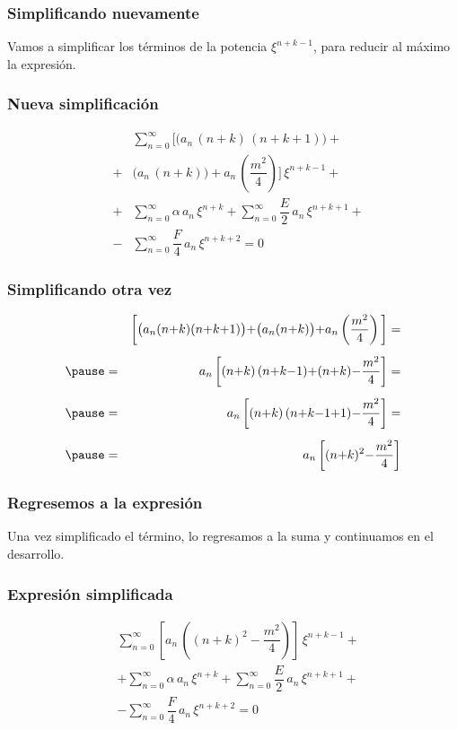 \begin{frame}
\frametitle{Simplificando nuevamente}
Vamos a simplificar los términos de la potencia $\xi^{n+k-1}$, para reducir al máximo la expresión.
\end{frame}
\begin{frame}
\frametitle{Nueva simplificación}
\vspace{-1cm}
\begin{eqnarray*}
&{}& \sum_{n=0}^{\infty} \bigg[ \big( a_{n} \, (n {+} k) \, (n {+} k {+} 1) \big) + \\[0.5em]
&+& \big( a_{n} \, (n {+} k) \big) {+} a_{n} \, \left( \dfrac{m^{2}}{4} \right) \bigg] \, \xi^{n+k-1} + \\[0.5em] 
&+& \sum_{n=0}^{\infty} \alpha \, a_{n} \, \xi^{n+k} + \sum_{n=0}^{\infty} \dfrac{E}{2} \, a_{n} \, \xi^{n+k+1} + \\[0.5em] 
&-& \sum_{n=0}^{\infty} \dfrac{F}{4} \, a_{n} \, \xi^{n+k+2} = 0
\end{eqnarray*}
\end{frame}
\begin{frame}
\frametitle{Simplificando otra vez}
\vspace{-1cm}
\begin{eqnarray*}
&{}& \bigg[ \big( a_{n} (n {+} k) (n {+} k {+} 1) \big) {+} \big( a_{n} (n {+} k) \big) {+} a_{n} \left( \dfrac{m^{2}}{4} \right) \bigg] = \\[0.5em] \pause
&=& a_{n} \, \bigg[  (n {+} k) \, (n {+} k {-} 1) {+} (n {+} k) {-} \dfrac{m^{2}}{4} \bigg] = \\[0.5em] \pause
&=& a_{n} \, \bigg[  (n {+} k) \, (n {+} k {-} 1 {+} {1}) {-} \dfrac{m^{2}}{4} \bigg] = \\[0.5em] \pause
&=& a_{n} \, \bigg[  (n {+} k)^{2} {-} \dfrac{m^{2}}{4} \bigg]
\end{eqnarray*}
\end{frame}
\begin{frame}
\frametitle{Regresemos a la expresión}
Una vez simplificado el término, lo regresamos a la suma y continuamos en el desarrollo.
\end{frame}
\begin{frame}
\frametitle{Expresión simplificada}
\vspace{-1cm}
\begin{align*}
&{} \sum_{n=0}^{\infty} \left[ a_{n} \, \left( (n {+} k)^{2} {-} \dfrac{m^{2}}{4} \right) \right] \, \xi^{n+k-1} + \\[0.5em] 
&+ \sum_{n=0}^{\infty} \alpha \, a_{n} \, \xi^{n+k} + \sum_{n=0}^{\infty} \dfrac{E}{2} \, a_{n} \, \xi^{n+k+1} + \\[0.5em] 
&- \sum_{n=0}^{\infty} \dfrac{F}{4} \, a_{n} \, \xi^{n+k+2} = 0
\end{align*}
\end{frame}
